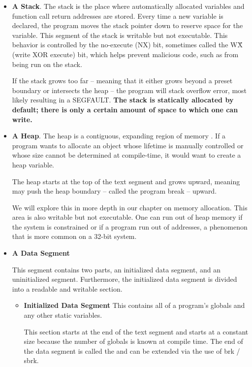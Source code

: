 \begin{itemize}
\item \textbf{A Stack}.
The stack is the place where automatically allocated variables and function call return addresses are stored.
Every time a new variable is declared, the program moves the stack pointer down to reserve space for the variable.
This segment of the stack is writable but not executable.
This behavior is controlled by the no-execute (NX) bit, sometimes called the W\^X (write XOR execute) bit, which helps prevent malicious code, such as  from being run on the stack.

If the stack grows too far -- meaning that it either grows beyond a preset boundary or intersects the heap -- the program will stack overflow error, most likely resulting in a SEGFAULT.
\textbf{The stack is statically allocated by default; there is only a certain amount of space to which one can write.}

\item \textbf{A Heap}.
The heap is a contiguous, expanding region of memory \cite{mallocinternals}.
If a program wants to allocate an object whose lifetime is manually controlled or whose size cannot be determined at compile-time, it would want to create a heap variable.

The heap starts at the top of the text segment and grows upward, meaning  may push the heap boundary -- called the program break -- upward.

We will explore this in more depth in our chapter on memory allocation.
This area is also writable but not executable.
One can run out of heap memory if the system is constrained or if a program run out of addresses, a phenomenon that is more common on a 32-bit system.

\item \textbf{A Data Segment}

  This segment contains two parts, an initialized data segment, and an uninitialized segment.
  Furthermore, the initialized data segment is divided into a readable and writable section.

\begin{itemize}
    \item \textbf{Initialized Data Segment}
          This contains all of a program's globals and any other static variables.

          This section starts at the end of the text segment and starts at a constant size because the number of globals is known at compile time. The end of the data segment is called the  and can be extended via the use of brk / sbrk.


\end{itemize}
\end{itemize}
